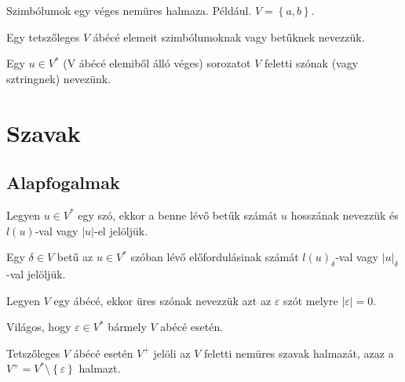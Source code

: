\begin{definition*}[ábécé]
	Szimbólumok egy véges nemüres halmaza. Például. $ V = \left\lbrace a,b \right\rbrace $.
\end{definition*}

\begin{definition*}[szimbólum]
	Egy tetszőleges $ V $ ábécé elemeit szimbólumoknak vagy betűknek nevezzük.
\end{definition*}

\begin{definition*}[szó]
	Egy $ u \in V^* $ (V ábécé elemiből álló véges) sorozatot $ V $ feletti szónak (vagy sztringnek) nevezünk.
\end{definition*}

\section{Szavak}
\subsection{Alapfogalmak}

\begin{definition*}
	Legyen $ u \in V^* $ egy szó, ekkor a benne lévő betűk számát $u$ hosszának nevezzük  és $ l(u) $-val vagy $\left| u \right| $-el jelöljük.
\end{definition*}

\begin{notation*}
	Egy $ \delta \in V $ betű az $ u \in V^* $ szóban lévő előfordulásinak számát $ l(u)_{\delta} $-val vagy $ \left| u \right|_{\delta} $-val jelöljük.
\end{notation*}

\begin{definition*}
	Legyen $V$ egy ábécé, ekkor üres szónak nevezzük azt az $ \varepsilon $ szót melyre $ \left| \varepsilon \right| = 0 $. 
\end{definition*}

\begin{remark}
	Világos, hogy $ \varepsilon \in V^* $  bármely $ V $ abécé esetén.
\end{remark}

\begin{definition*}[$ V^+ $]
	Tetszőleges $ V $ ábécé esetén $ V^+ $ jelöli az $ V $ feletti nemüres szavak halmazát, azaz a $ V^+ = V^* \setminus \left\lbrace \varepsilon \right\rbrace $ halmazt. 
\end{definition*}


